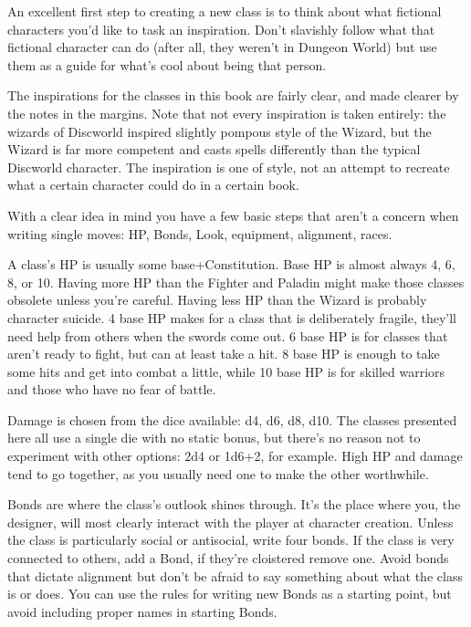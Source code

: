  

An excellent first step to creating a new class is to think about what fictional characters you'd like to task an inspiration. Don't slavishly follow what that fictional character can do (after all, they weren't in Dungeon World) but use them as a guide for what's cool about being that person.

 

The inspirations for the classes in this book are fairly clear, and made clearer by the notes in the margins. Note that not every inspiration is taken entirely: the wizards of Discworld inspired slightly pompous style of the Wizard, but the Wizard is far more competent and casts spells differently than the typical Discworld character. The inspiration is one of style, not an attempt to recreate what a certain character could do in a certain book.

 

With a clear idea in mind you have a few basic steps that aren't a concern when writing single moves: HP, Bonds, Look, equipment, alignment, races.

 

A class's HP is usually some base+Constitution. Base HP is almost always 4, 6, 8, or 10. Having more HP than the Fighter and Paladin might make those classes obsolete unless you're careful. Having less HP than the Wizard is probably character suicide. 4 base HP makes for a class that is deliberately fragile, they'll need help from others when the swords come out. 6 base HP is for classes that aren't ready to fight, but can at least take a hit. 8 base HP is enough to take some hits and get into combat a little, while 10 base HP is for skilled warriors and those who have no fear of battle.

 

Damage is chosen from the dice available: d4, d6, d8, d10. The classes presented here all use a single die with no static bonus, but there's no reason not to experiment with other options: 2d4 or 1d6+2, for example. High HP and damage tend to go together, as you usually need one to make the other worthwhile.

 

Bonds are where the class's outlook shines through. It's the place where you, the designer, will most clearly interact with the player at character creation. Unless the class is particularly social or antisocial, write four bonds. If the class is very connected to others, add a Bond, if they're cloistered remove one. Avoid bonds that dictate alignment but don't be afraid to say something about what the class is or does. You can use the rules for writing new Bonds as a starting point, but avoid including proper names in starting Bonds.

